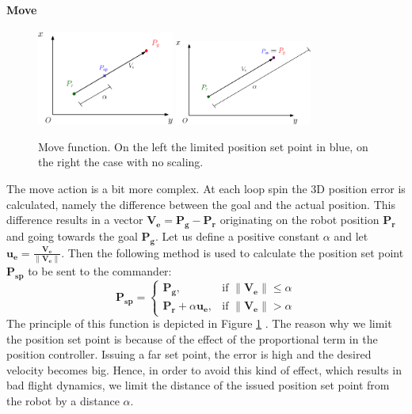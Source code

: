 \paragraph{Move} 

\begin{figure}[h]
\centering
 \includegraphics[width=0.4\textwidth]{move1.eps}\hspace{0.1\textwidth}
 \includegraphics[width=0.4\textwidth]{move2.eps}\\[1em]
 \caption[Move function.]{Move function. On the left the limited position set point in blue, on the right the case with no scaling.}
  \label{figure:move}
\end{figure}

The move action is a bit more complex. At each loop spin the 3D position error is calculated, namely the difference between the goal and the actual position.  This difference results in a vector $\boldsymbol{V_e} = \boldsymbol{P_g} - \boldsymbol{P_r}$ originating on the robot position $\boldsymbol{P_r}$ and going towards the goal $\boldsymbol{P_g}$. Let us define a positive constant $\alpha$ and let $\boldsymbol{u_e} = 	\frac{\boldsymbol{V_e}}{\lVert\boldsymbol{V_e}\rVert}$. Then the following method is used to calculate the position set point $\boldsymbol{P_{sp}}$ to be sent to the commander: 
\begin{equation}
\boldsymbol{P_{sp}} = 
\begin{cases}
    \boldsymbol{P_g}, & \text{if } \lVert\boldsymbol{V_e} \rVert \leq \alpha \\
    \boldsymbol{P_r} + \alpha \boldsymbol{u_e},&    \text{if } \lVert\boldsymbol{V_e}\rVert > \alpha
\end{cases}
\label{eq:move}
\end{equation}
The principle of this function is depicted in Figure \ref{figure:move} . The reason why we limit the position set point is because of the effect of the proportional term in the position controller. Issuing a far set point, the error is high and the desired velocity becomes big. Hence, in order to avoid this kind of effect, which results in bad flight dynamics, we limit the distance of the issued position set point from the robot by a distance $\alpha$.

